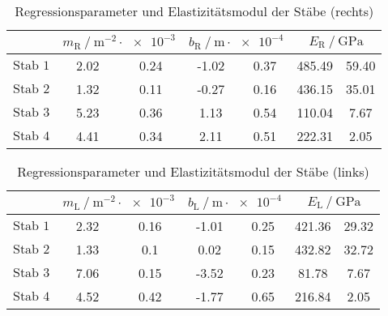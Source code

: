 \begin{table}
  \centering
  \caption{Regressionsparameter und Elastizitätsmodul der Stäbe (rechts)}
  \label{tab:regressiondouble}
  \begin{tabular} {S[table-format=3.0] 
    S[table-format=1.2] @{${}\pm{}$} S[table-format=1.2]
    S[table-format=1.2] @{${}\pm{}$} S[table-format=1.2]  
    S[table-format=3.2] @{${}\pm{}$} S[table-format=2.2]}
  \toprule
  &  & 
     & 
    \\
  \midrule
  {$\text{Stab 1}$}  & 2.02 & 0.24 & -1.02 & 0.37 & 485.49 & 59.40 \\
  {$\text{Stab 2}$}  & 1.32 & 0.11 & -0.27 & 0.16 & 436.15 & 35.01 \\
  {$\text{Stab 3}$}  & 5.23 & 0.36 & 1.13  & 0.54 & 110.04 & 7.67  \\ 
  {$\text{Stab 4}$}  & 4.41 & 0.34 & 2.11  & 0.51 & 222.31 & 2.05  \\
  \bottomrule
  \end{tabular}
\end{table}
\begin{table}
  \centering
  \caption{Regressionsparameter und Elastizitätsmodul der Stäbe (links)}
  \label{tab:regressiondoublelinks}
  \begin{tabular} {S[table-format=3.0]  
    S[table-format=1.2] @{${}\pm{}$} S[table-format=1.2]
    S[table-format=1.2] @{${}\pm{}$} S[table-format=1.2]
    S[table-format=3.2] @{${}\pm{}$} S[table-format=2.2]}
  \toprule
  &  & 
     &
    \\
  \midrule
  {$\text{Stab 1}$} & 2.32 & 0.16 & -1.01 & 0.25 & 421.36 & 29.32 \\
  {$\text{Stab 2}$} & 1.33 & 0.1  & 0.02  & 0.15 & 432.82 & 32.72\\
  {$\text{Stab 3}$} & 7.06 & 0.15 & -3.52 & 0.23 & 81.78  & 7.67  \\ 
  {$\text{Stab 4}$} & 4.52 & 0.42 & -1.77 & 0.65 & 216.84 & 2.05  \\
  \bottomrule
  \end{tabular}
\end{table}